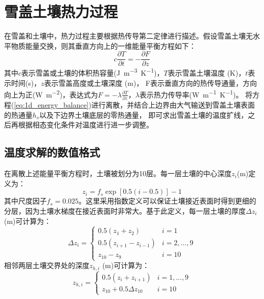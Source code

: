 \chapter{雪盖土壤热力过程}


在雪盖和土壤中，热力过程主要根据热传导第二定律进行描述。假设雪盖土壤无水平物质能量交换，则其垂直方向上的一维能量平衡方程如下：
\begin{equation}\label{eq:1d_energy_balance}
c \frac{\partial T}{\partial t}=-\frac{\partial F}{\partial z}
\end{equation}
其中$c$表示雪盖或土壤的体积热容量(\unit{J.m^{-3}.K^{-1}})，$T$表示雪盖土壤温度 (K)，$t$表示时间(s)，$z$表示雪盖高度或土壤深度 (m)，
F表示垂直方向的热传导通量，方向向上为正(\unit{W.m^{-2}})，表达式为$F=-\lambda\frac{\partial T}{\partial z}$，$\lambda$表示热力传导率(\unit{W.m^{-1}.K^{-1}})。
将方程(\ref{eq:1d_energy_balance})进行离散，并结合上边界由大气输送到雪盖土壤表面的热通量$h_s$以及下边界土壤底层的零热通量，
即可求出雪盖土壤的温度扩线，之后再根据相态变化条件对温度进行进一步调整。


\section{温度求解的数值格式}\label{温度求解的数值格式}
在离散上述能量平衡方程时，土壤被划分为10层。每一层土壤的中心深度$z_i$(m)定义为：
\begin{equation}
z_{i}=f_{s} \exp [0.5(i-0.5)]-1
\end{equation}
%
其中尺度因子$f_s=0.025$。这里采用指数定义可以保证土壤接近表面时得到更细的分层，因为土壤水梯度在接近表面时非常大。基于此定义，每一层土壤的厚度$\Delta z_i$ (m)可计算为：
\begin{equation}
\Delta z_{i}=\left\{\begin{array}{ll}0.5\left(z_{1}+z_{2}\right) & i=1 \\
0.5\left(z_{i+1}-z_{i-1}\right) & i=2, \ldots, 9 \\ 
z_{10}-z_{9} & i=10\end{array}\right.
\end{equation}
相邻两层土壤交界处的深度$z_{h,i}$ (m)可计算为：
\begin{equation}
z_{h, i}=\left\{\begin{array}{ll}0.5\left(z_{i}+z_{i+1}\right) & i=1, \ldots, 9 \\
z_{10}+0.5 \Delta z_{10} & i=10\end{array}\right.
\end{equation}


